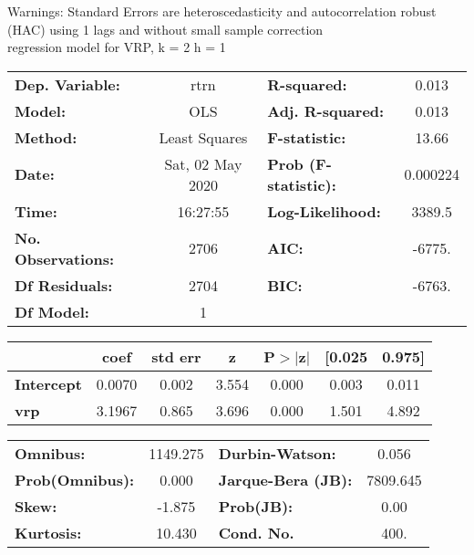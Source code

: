 Warnings: \newline
 [1] Standard Errors are heteroscedasticity and autocorrelation robust (HAC) using 1 lags and without small sample correction\\ 

regression model for VRP, k = 2 h = 1\begin{center}
\begin{tabular}{lclc}
\toprule
\textbf{Dep. Variable:}    &       rtrn       & \textbf{  R-squared:         } &     0.013   \\
\textbf{Model:}            &       OLS        & \textbf{  Adj. R-squared:    } &     0.013   \\
\textbf{Method:}           &  Least Squares   & \textbf{  F-statistic:       } &     13.66   \\
\textbf{Date:}             & Sat, 02 May 2020 & \textbf{  Prob (F-statistic):} &  0.000224   \\
\textbf{Time:}             &     16:27:55     & \textbf{  Log-Likelihood:    } &    3389.5   \\
\textbf{No. Observations:} &        2706      & \textbf{  AIC:               } &    -6775.   \\
\textbf{Df Residuals:}     &        2704      & \textbf{  BIC:               } &    -6763.   \\
\textbf{Df Model:}         &           1      & \textbf{                     } &             \\
\bottomrule
\end{tabular}
\begin{tabular}{lcccccc}
                   & \textbf{coef} & \textbf{std err} & \textbf{z} & \textbf{P$> |$z$|$} & \textbf{[0.025} & \textbf{0.975]}  \\
\midrule
\textbf{Intercept} &       0.0070  &        0.002     &     3.554  &         0.000        &        0.003    &        0.011     \\
\textbf{vrp}       &       3.1967  &        0.865     &     3.696  &         0.000        &        1.501    &        4.892     \\
\bottomrule
\end{tabular}
\begin{tabular}{lclc}
\textbf{Omnibus:}       & 1149.275 & \textbf{  Durbin-Watson:     } &    0.056  \\
\textbf{Prob(Omnibus):} &   0.000  & \textbf{  Jarque-Bera (JB):  } & 7809.645  \\
\textbf{Skew:}          &  -1.875  & \textbf{  Prob(JB):          } &     0.00  \\
\textbf{Kurtosis:}      &  10.430  & \textbf{  Cond. No.          } &     400.  \\
\bottomrule
\end{tabular}
\end{center}

